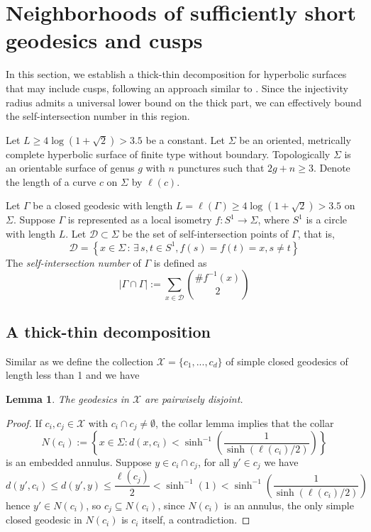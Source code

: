 \documentclass[11pt, a4paper]{article}
\newtheorem{lemma}[thm]{Lemma}
\theoremstyle{definition}
\theoremstyle{remark}
\newcommand{\cald}{\mathcal{D}}
\newcommand{\calx}{\mathcal{X}}
\newcommand{\abs}[1]{\left| #1 \right|}
\newcommand{\set}[1]{\left\{ #1 \right\}}
\newcommand{\bracket}[1]{\left( #1 \right)}
\begin{document}
\section{Neighborhoods of sufficiently short geodesics and cusps}\label{section2}

In this section, we establish a thick-thin decomposition for hyperbolic surfaces that may include cusps, following an approach similar to \cite{Y2800}. Since the injectivity radius admits a universal lower bound on the thick part, we can effectively bound the self-intersection number in this region.


Let $L\geqslant4\log(1+\sqrt{2})>3.5$ be a constant. Let $\Sigma$ be an oriented, metrically complete hyperbolic surface of finite type without boundary. Topologically $\Sigma$ is an orientable surface of genus $g$ with $n$ punctures such that $2g+n\geqslant 3$. Denote the length of a curve $c$ on $\Sigma$ by $\ell(c)$. 

Let $\Gamma$ be a closed geodesic with length $L=\ell(\Gamma)\geqslant4\log(1+\sqrt{2})>3.5$ on $\Sigma$. Suppose $\Gamma$ is represented as a local isometry $f:S^1\to\Sigma$, where $S^1$ is a circle with length $L$. Let $\cald\subset\Sigma$ be the set of self-intersection points of $\Gamma$, that is,
$$\cald=\set{x\in\Sigma\,:\, \exists\,s,t\in S^1, f(s)=f(t)=x, s\neq t}$$
The \emph{self-intersection number} of $\Gamma$ is defined as
\begin{equation}\label{eqn:self_intersection_number_defn}
\abs{\Gamma\cap\Gamma}:=\sum_{x\in \cald}\binom{\# f^{-1}(x)}{2}
\end{equation}



\subsection{A thick-thin decomposition}



Similar as \cite{Y2800} we define the collection $\calx=\{c_1,...,c_d\}$ of simple closed geodesics of length less than 1 and we have 

\begin{lemma}
The geodesics in $\calx$ are pairwisely disjoint. 
\end{lemma}

\begin{proof}
If $c_i,c_j\in\calx$ with $c_i\cap c_j\neq\emptyset$, the collar lemma \cite[Lemma 13.6]{FM2012} implies that the collar
$$N(c_i):=\set{x\in\Sigma:d(x,c_i)<\sinh^{-1}\bracket{\frac1{\sinh(\ell(c_i)/2)}}}$$
is an embedded annulus. Suppose $y\in c_i\cap c_j$, for all $y'\in c_j$ we have
$$d(y',c_i)\leqslant d(y',y)\leqslant \frac{\ell(c_j)}2<\sinh^{-1}(1)<\sinh^{-1}\left(\frac1{\sinh(\ell(c_i)/2)}\right)$$
hence $y'\in N(c_i)$, so $c_j\subseteq N(c_i)$, since $N(c_i)$ is an annulus, the only simple closed geodesic in $N(c_i)$ is $c_i$ itself, a contradiction.


\end{proof}
\end{document}

